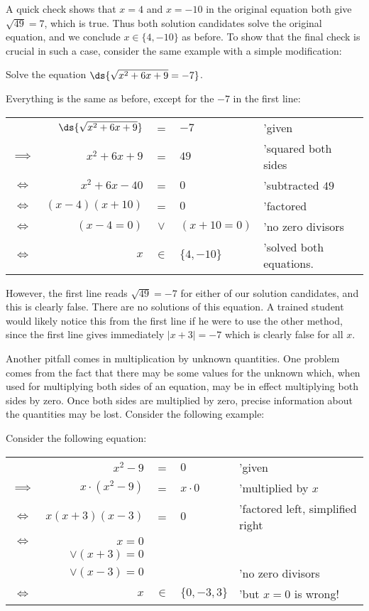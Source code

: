 A quick check shows that $x=4$ and $x=-10$ in the original
equation both give $\sqrt{49}=7$, which is true. Thus
both solution candidates solve the
original equation, and we conclude $x\in\{4,-10\}$ as before.   
\eex
To show that the final check is crucial in such a case,
consider the same example with a simple modification:

\bex Solve the equation $\ds{\sqrt{x^2+6x+9}=-7}$.

Everything is the same as before, except for the $-7$ in the first
line:
 
\noindent\begin{tabular}{crcll}
&$\ds{\sqrt{x^2+6x+9}}$&=&$-7$&'given\\
$\implies$&$x^2+6x+9$&=&$49$&'squared both sides\\
$\iff$&$x^2+6x-40$&=&$0$&'subtracted $49$ \\
$\iff$&$(x-4)(x+10)$&=&$0$&'factored\\
$\iff$&$(x-4=0)$&$\vee$&$(x+10=0)$&'no  zero divisors\\
$\iff$&$x$&$\in$&$\{4,-10\}$&'solved both equations.
\end{tabular}

However, the first line reads $\sqrt{49}=-7$ for either of our
solution candidates, and this is clearly false.  There are
no solutions of this equation.  A trained student would likely
notice this from the first line if he were to use the other method,
since the first line gives immediately
$|x+3|=-7$ which is clearly false 
for all $x$.
\eex 



Another pitfall comes in multiplication by unknown quantities.
One  problem comes from the fact that there may be some
values for the unknown which, when used for multiplying both
sides of an equation, may be in effect multiplying both sides
by zero.  Once both sides are multiplied by zero,  precise information
about the quantities may be lost.  Consider the following
example:

\bex  Consider the following equation: 

\begin{tabular}{crcll}
&$x^2-9$&=& $0$&'given\\
$\implies$&$x\cdot\left(x^2-9\right)$&=&$x\cdot0$&'multiplied by $x$\\
$\iff$&$x(x+3)(x-3)$&=&$0$&'factored left, simplified right\\
$\iff$&$x=0$&&&\\
&$\vee (x+3)=0$&&\\
&$\vee(x-3)=0$ &&&'no  zero divisors\\
$\iff$&$x$&$\in$&$\{0,-3,3\}$&'but  $x=0$ is wrong! 
\end{tabular}
\eex

